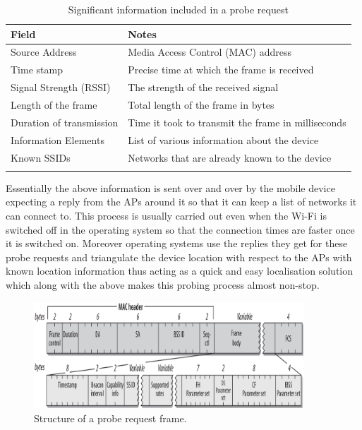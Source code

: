 \begin{table}
  \footnotesize
  \begin{center}
    \begin{tabular}{lp{6.5cm}}
      \toprule
        Field & Notes\\
      \midrule
        \addlinespace[0.2cm]
        Source Address & Media Access Control (MAC) address\\
        \addlinespace[0.2cm]
        Time stamp & Precise time at which the frame is received\\
        \addlinespace[0.2cm]
        Signal Strength (RSSI) & The strength of the received signal\\
        \addlinespace[0.2cm]
        Length of the frame & Total length of the frame in bytes\\
        \addlinespace[0.2cm]
        Duration of transmission & Time it took to transmit the frame in milliseconds\\
        \addlinespace[0.2cm]
        Information Elements & List of various information about the device\\
        \addlinespace[0.2cm]
        Known SSIDs & Networks that are already known to the device\\
        \addlinespace[0.1cm]
      \bottomrule
    \end{tabular}
  \end{center}
  \caption{Significant information included in a probe request}
  \label{table:collection:proberequest}
\end{table}

Essentially the above information is sent over and over by the mobile device expecting a reply from the APs around it so that it can keep a list of networks it can connect to.
This process is usually carried out even when the Wi-Fi is switched off in the operating system so that the connection times are faster once it is switched on.
Moreover operating systems use the replies they get for these probe requests and triangulate the device location with respect to the APs with known location information thus acting as a quick and easy localisation solution which along with the above makes this probing process almost non-stop. 

\begin{figure}
  \includegraphics[width=0.9\textwidth,trim={0 -30 0 -10},clip]{images/probe-request-structure.png}
  \caption{Structure of a probe request frame. }
  \label{figure:collection:proberequest}
\end{figure}


